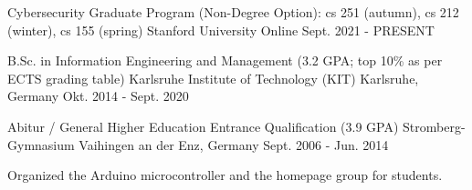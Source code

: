 

\begin{cventries}

  \cventry
    {Cybersecurity Graduate Program (Non-Degree Option): cs 251 (autumn), cs 212 (winter), cs 155 (spring)} %
    {Stanford University} %
    {Online} %
    {Sept. 2021 - PRESENT} %
    {}

  \cventry
    {B.Sc. in Information Engineering and Management (3.2 GPA; top 10\% as per ECTS grading table)} %
    {Karlsruhe Institute of Technology (KIT) } %
    {Karlsruhe, Germany} %
    {Okt. 2014 - Sept. 2020} %
    {}
  
  \cventry
    {Abitur / General Higher Education Entrance Qualification  (3.9 GPA)} %
    {Stromberg-Gymnasium} %
    {Vaihingen an der Enz, Germany} %
    {Sept. 2006 - Jun. 2014} %
    {
      \begin{cvitems} %
        \item {Organized the Arduino microcontroller and the homepage group for students.}
      \end{cvitems}
    }

\end{cventries}
